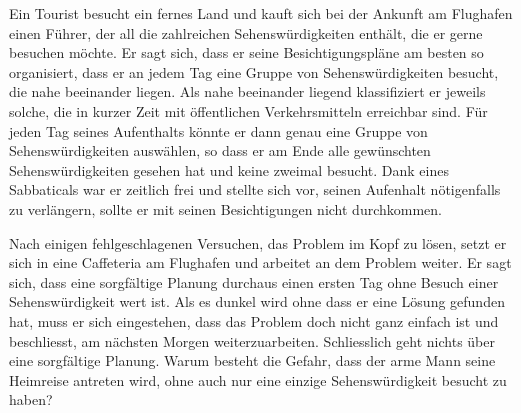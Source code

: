 Ein Tourist besucht ein fernes Land und kauft sich bei der Ankunft
am Flughafen einen Führer, der all die zahlreichen Sehenswürdigkeiten enthält,
die er gerne besuchen möchte.
Er sagt sich, dass er seine Besichtigungspläne am besten so organisiert,
dass er an jedem Tag eine Gruppe von Sehenswürdigkeiten  besucht, die
nahe beeinander liegen.
Als nahe beeinander liegend klassifiziert er jeweils solche, die in kurzer
Zeit mit öffentlichen Verkehrsmitteln erreichbar sind.
Für jeden Tag seines Aufenthalts könnte er dann genau eine Gruppe von
Sehenswürdigkeiten auswählen, so dass er am Ende alle gewünschten
Sehenswürdigkeiten gesehen hat und keine zweimal besucht.
Dank eines Sabbaticals war er zeitlich frei und stellte sich vor,
seinen Aufenhalt nötigenfalls zu verlängern, sollte er mit seinen
Besichtigungen nicht durchkommen.

Nach einigen fehlgeschlagenen Versuchen, das Problem im Kopf zu lösen,
setzt er sich in eine Caffeteria am Flughafen und arbeitet an dem Problem
weiter.
Er sagt sich, dass eine sorgfältige Planung durchaus einen ersten Tag
ohne Besuch einer Sehenswürdigkeit wert ist.
Als es dunkel wird ohne dass er eine Lösung gefunden hat, muss er sich
eingestehen, dass das Problem doch nicht ganz einfach ist und beschliesst,
am nächsten Morgen weiterzuarbeiten.
Schliesslich geht nichts über eine sorgfältige Planung.
Warum besteht die Gefahr, dass der arme Mann seine Heimreise antreten wird,
ohne auch nur eine einzige Sehenswürdigkeit besucht zu haben?


